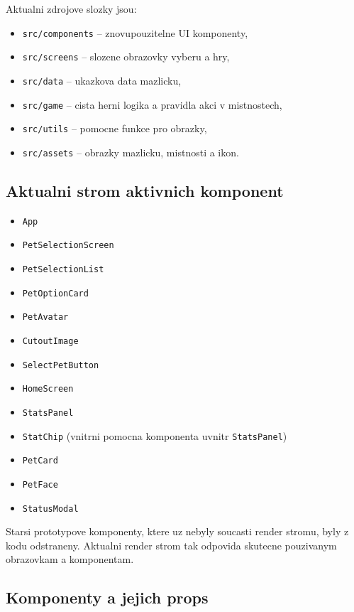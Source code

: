 \documentclass[12pt,a4paper]{article}
\begin{document}
Aktualni zdrojove slozky jsou:
\begin{itemize}[leftmargin=2em]
  \item \texttt{src/components} -- znovupouzitelne UI komponenty,
  \item \texttt{src/screens} -- slozene obrazovky vyberu a hry,
  \item \texttt{src/data} -- ukazkova data mazlicku,
  \item \texttt{src/game} -- cista herni logika a pravidla akci v mistnostech,
  \item \texttt{src/utils} -- pomocne funkce pro obrazky,
  \item \texttt{src/assets} -- obrazky mazlicku, mistnosti a ikon.
\end{itemize}

\subsection*{Aktualni strom aktivnich komponent}

\begin{itemize}[leftmargin=2em]
  \item \texttt{App}
  \item \texttt{PetSelectionScreen}
  \item \texttt{PetSelectionList}
  \item \texttt{PetOptionCard}
  \item \texttt{PetAvatar}
  \item \texttt{CutoutImage}
  \item \texttt{SelectPetButton}
  \item \texttt{HomeScreen}
  \item \texttt{StatsPanel}
  \item \texttt{StatChip} (vnitrni pomocna komponenta uvnitr \texttt{StatsPanel})
  \item \texttt{PetCard}
  \item \texttt{PetFace}
  \item \texttt{StatusModal}
\end{itemize}

Starsi prototypove komponenty, ktere uz nebyly soucasti render stromu, byly z kodu odstraneny. Aktualni render strom tak odpovida skutecne pouzivanym obrazovkam a komponentam.

\subsection*{Komponenty a jejich props}
\end{document}
